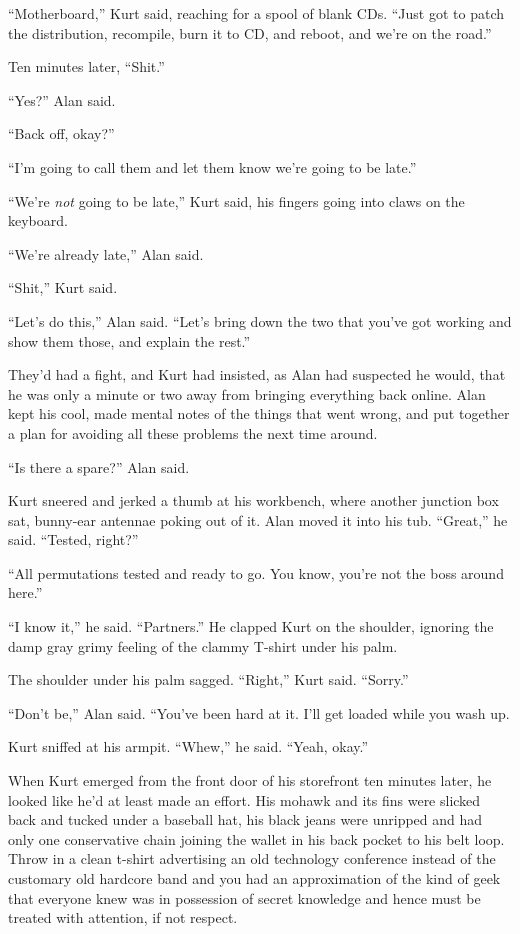 ``Motherboard,'' Kurt said, reaching for a spool of blank CDs.  ``Just
got to patch the distribution, recompile, burn it to CD, and reboot,
and we're on the road.''

Ten minutes later, ``Shit.''

``Yes?'' Alan said.

``Back off, okay?''

``I'm going to call them and let them know we're going to be late.''

``We're \textit{not} going to be late,'' Kurt said, his fingers going
into claws on the keyboard.

``We're already late,'' Alan said.

``Shit,'' Kurt said.

``Let's do this,'' Alan said.  ``Let's bring down the two that you've
got working and show them those, and explain the rest.''

They'd had a fight, and Kurt had insisted, as Alan had suspected he
would, that he was only a minute or two away from bringing everything
back online.  Alan kept his cool, made mental notes of the things that
went wrong, and put together a plan for avoiding all these problems
the next time around.

``Is there a spare?'' Alan said.

Kurt sneered and jerked a thumb at his workbench, where another
junction box sat, bunny-ear antennae poking out of it.  Alan moved it
into his tub.  ``Great,'' he said.  ``Tested, right?''

``All permutations tested and ready to go.  You know, you're not the
boss around here.''

``I know it,'' he said.  ``Partners.'' He clapped Kurt on the
shoulder, ignoring the damp gray grimy feeling of the clammy T-shirt
under his palm.

The shoulder under his palm sagged.  ``Right,'' Kurt said.  ``Sorry.''

``Don't be,'' Alan said.  ``You've been hard at it.  I'll get loaded
while you wash up.

Kurt sniffed at his armpit.  ``Whew,'' he said.  ``Yeah, okay.''

When Kurt emerged from the front door of his storefront ten minutes
later, he looked like he'd at least made an effort.  His mohawk and
its fins were slicked back and tucked under a baseball hat, his black
jeans were unripped and had only one conservative chain joining the
wallet in his back pocket to his belt loop.  Throw in a clean t-shirt
advertising an old technology conference instead of the customary old
hardcore band and you had an approximation of the kind of geek that
everyone knew was in possession of secret knowledge and hence must be
treated with attention, if not respect.


